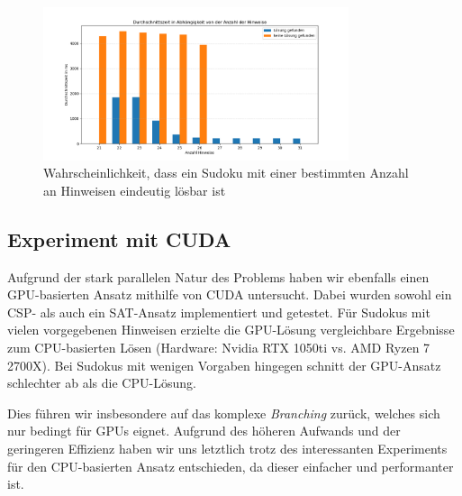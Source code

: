 \begin{figure}[h!]
    \centering
    \includegraphics[width=0.8\textwidth]{Pictures/zeiten}
    \caption{Wahrscheinlichkeit, dass ein Sudoku mit einer bestimmten Anzahl an Hinweisen eindeutig lösbar ist}
    \label{fig:zeiten}
\end{figure}

\subsection{Experiment mit CUDA}

Aufgrund der stark parallelen Natur des Problems haben wir ebenfalls einen GPU-basierten Ansatz mithilfe von CUDA untersucht. Dabei wurden sowohl ein CSP- als auch ein SAT-Ansatz implementiert und getestet.
Für Sudokus mit vielen vorgegebenen Hinweisen erzielte die GPU-Lösung vergleichbare Ergebnisse zum CPU-basierten Lösen (Hardware: Nvidia RTX 1050ti vs. AMD Ryzen 7 2700X). Bei Sudokus mit wenigen Vorgaben hingegen schnitt der GPU-Ansatz schlechter ab als die CPU-Lösung.

Dies führen wir insbesondere auf das komplexe \emph{Branching} zurück, welches sich nur bedingt für GPUs eignet. Aufgrund des höheren Aufwands und der geringeren Effizienz haben wir uns letztlich trotz des interessanten Experiments für den CPU-basierten Ansatz entschieden, da dieser einfacher und performanter ist.